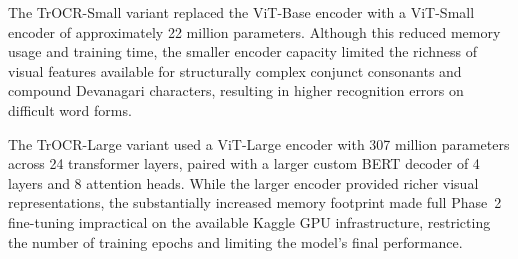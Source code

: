 \noindent The TrOCR-Small variant replaced the ViT-Base encoder with a ViT-Small encoder of approximately 22 million parameters. Although this reduced memory usage and training time, the smaller encoder capacity limited the richness of visual features available for structurally complex conjunct consonants and compound Devanagari characters, resulting in higher recognition errors on difficult word forms.

\noindent The TrOCR-Large variant used a ViT-Large encoder with 307 million parameters across 24 transformer layers, paired with a larger custom BERT
decoder of 4 layers and 8 attention heads. While the larger encoder provided richer visual representations, the substantially increased memory footprint made full Phase~2 fine-tuning impractical on the available Kaggle GPU infrastructure, restricting the number of training epochs and limiting the model's final performance.
 
